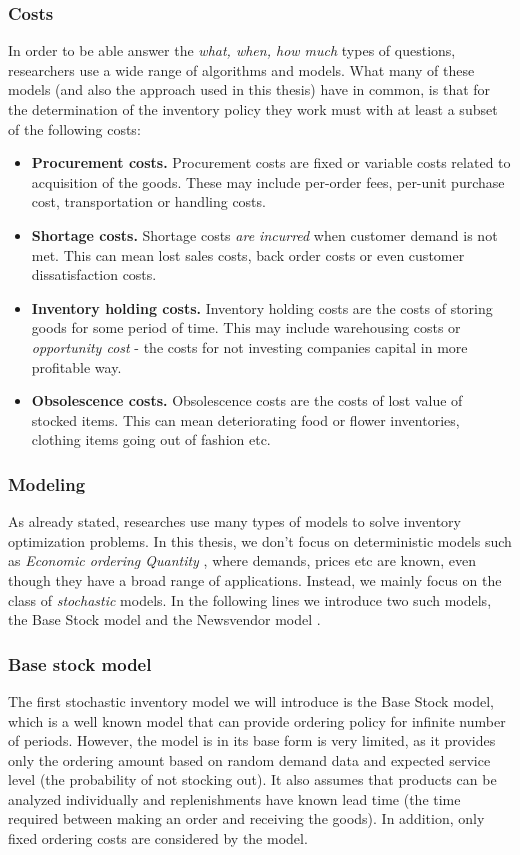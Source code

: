 \documentclass[11pt,a4paper]{article}
\begin{document}
\subsubsection{Costs}
In order to be able answer the \textit{what, when, how much} types of questions, researchers use a wide range of algorithms and models. What many of  these models (and also the approach used in this thesis) have in common, is that for the determination of the inventory policy they work must with at least a subset of the following costs\cite{intro_ls}:
\begin{itemize}
\item \textbf{Procurement costs.} Procurement costs are fixed or variable costs related to acquisition of the goods. These may include per-order fees, per-unit purchase cost, transportation or handling costs.  
\item \textbf{Shortage costs.} Shortage costs \textit{are incurred} when customer demand is not met. This can mean lost sales costs, back order costs or even customer dissatisfaction costs.

\item \textbf{Inventory holding costs.} Inventory holding costs are the costs of storing goods for some period of time. This may include  warehousing costs or \textit{opportunity cost} - the costs for not investing companies capital in more profitable way.

\item \textbf{Obsolescence costs.} Obsolescence costs are the costs of lost value of stocked items. This can mean deteriorating food or flower inventories, clothing items going out of fashion etc. 
\end{itemize}
\subsubsection{Modeling}
As already stated, researches use many types of models to solve inventory optimization problems.
In this thesis, we don't focus on deterministic models such as \textit{Economic ordering Quantity} \cite{eoq}, where demands, prices etc are known, even though they have a broad range of applications. Instead, we mainly focus on the class of \textit{stochastic} models. In the following lines we introduce two such models, the Base Stock \cite{supply} model and the Newsvendor model \cite{sp_book}.

\subsubsection{Base stock model}
The first stochastic inventory model we will introduce is the Base Stock model, which is a well known model that can provide ordering policy for infinite number of periods.
However, the model is in its base form is very limited, as it provides only the ordering amount based on random demand data and expected service level (the probability of not stocking out). It also assumes that products can be analyzed individually and replenishments have known lead time (the time required between making an order and receiving the goods). In addition, only fixed ordering costs are considered by the model.
\end{document}
